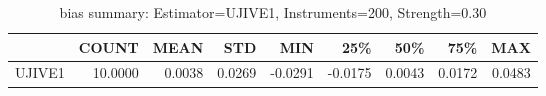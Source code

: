 \begin{table}[ht]
\centering
\caption{bias summary: Estimator=UJIVE1, Instruments=200, Strength=0.30}
\begin{tabular}{lrrrrrrrr}
\toprule
 & COUNT & MEAN & STD & MIN & 25\% & 50\% & 75\% & MAX \\
\midrule
UJIVE1 & 10.0000 & 0.0038 & 0.0269 & -0.0291 & -0.0175 & 0.0043 & 0.0172 & 0.0483 \\
\bottomrule
\end{tabular}
\end{table}
